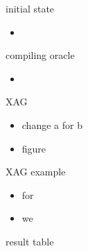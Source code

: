 \documentclass[aspectratio=1610]{beamer}
\begin{document}
\begin{frame}{initial state}
  \begin{itemize}
    \item 
  \end{itemize}
\end{frame}
\begin{frame}{compiling oracle}
  \begin{itemize}
    \item 
  \end{itemize}
\end{frame}
\begin{frame}{XAG}
  \begin{itemize}
    \item change a for b
    \item figure
  \end{itemize}
\end{frame}
\begin{frame}{XAG example}
  \begin{itemize}
    \item for
    \item we 
  \end{itemize}
\end{frame}
\begin{frame}{result}
  table   
\end{frame}
\end{document}
